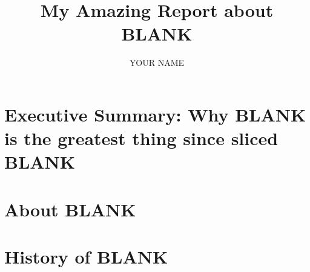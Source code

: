 \documentclass{article}
\title{My Amazing Report about BLANK}
\author{YOUR NAME}
\begin{document}
\maketitle

\section{Executive Summary: Why BLANK is the greatest thing since sliced BLANK}

\section{About BLANK}

\section{History of BLANK}
\end{document}
